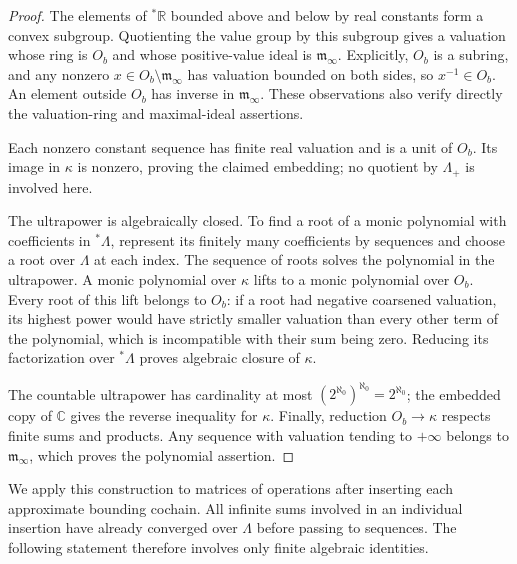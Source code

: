 \documentclass[11pt]{article}
\numberwithin{equation}{section}
\theoremstyle{definition}
\theoremstyle{remark}
\newcommand{\C}{\mathbb C}
\newcommand{\R}{\mathbb R}
\begin{document}
\begin{proof}
The elements of ${}^*\R$ bounded above and below by real constants
form a convex subgroup.  Quotienting the value group by this subgroup
gives a valuation whose ring is $O_b$ and whose positive-value ideal
is $\mathfrak m_\infty$.  Explicitly, $O_b$ is a subring, and any
nonzero $x\in O_b\setminus\mathfrak m_\infty$ has valuation bounded
on both sides, so $x^{-1}\in O_b$.  An element outside $O_b$ has inverse
in $\mathfrak m_\infty$.  These observations also verify directly the
valuation-ring and maximal-ideal assertions.

Each nonzero constant sequence has finite real valuation and is a
unit of $O_b$.  Its image in $\kappa$ is nonzero, proving the claimed
embedding; no quotient by $\Lambda_+$ is involved here.

The ultrapower is algebraically closed.  To find a root of a monic
polynomial with coefficients in ${}^*\Lambda$, represent its finitely
many coefficients by sequences and choose a root over $\Lambda$ at
each index.  The sequence of roots solves the polynomial in the
ultrapower.  A monic polynomial over $\kappa$ lifts to a monic
polynomial over $O_b$.  Every root of this lift belongs to $O_b$:
if a root had negative coarsened valuation, its highest power would
have strictly smaller valuation than every other term of the
polynomial, which is incompatible with their sum being zero.
Reducing its factorization over ${}^*\Lambda$ proves algebraic closure
of $\kappa$.

The countable ultrapower has cardinality at most
$(2^{\aleph_0})^{\aleph_0}=2^{\aleph_0}$; the embedded copy of $\C$
gives the reverse inequality for $\kappa$.  Finally, reduction
$O_b\to\kappa$ respects finite sums and products.  Any sequence with
valuation tending to $+\infty$ belongs to $\mathfrak m_\infty$, which
proves the polynomial assertion.
\end{proof}

We apply this construction to matrices of operations after inserting
each approximate bounding cochain.  All infinite sums involved in an
individual insertion have already converged over $\Lambda$ before
passing to sequences.  The following statement therefore involves
only finite algebraic identities.
\end{document}
